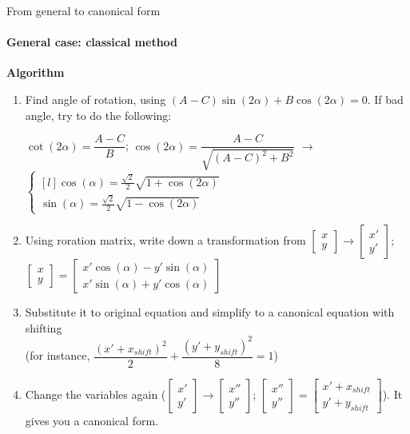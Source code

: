 \documentclass[aspectratio=169]{beamer}
\begin{document}
\begin{frame}[t]{From general to canonical form}
\framesubtitle{General case: classical method}
\scriptsize
\vspace{-0.2cm}
        \textbf{Algorithm}
        \begin{enumerate}
            \item Find angle of rotation, using $(A-C)\sin(2\alpha) + B\cos(2\alpha)=0$. If bad angle, try to do the following: \medskip

             $\cot(2\alpha)=\dfrac{A-C}{B}$; $\cos(2\alpha)=\dfrac{A-C}{\sqrt{(A-C)^2+B^2}}$ $\rightarrow$ $\left\{\begin{matrix*}[l] \cos(\alpha)=\frac{\sqrt{2}}{2}\sqrt{1+\cos(2\alpha)}
            \\ \sin(\alpha)=\frac{\sqrt{2}}{2}\sqrt{1-\cos(2\alpha)}
            \end{matrix*}\right.$
            \item Using roration matrix, write down a transformation from $\begin{bmatrix}x\\y\end{bmatrix} \rightarrow \begin{bmatrix}x'\\y'\end{bmatrix}$; $\begin{bmatrix}x\\y\end{bmatrix} = \begin{bmatrix}
            x'\cos(\alpha) - y'\sin(\alpha)\\ 
            x'\sin(\alpha) + y'\cos(\alpha) 
            \end{bmatrix}$
            \item Substitute it to original equation and simplify to a canonical equation with shifting \\ (for instance, $\dfrac{(x'+x_{shift})^2}{2}+\dfrac{(y'+y_{shift})^2}{8}=1$)
            \item Change the variables again ($\begin{bmatrix}x'\\y'\end{bmatrix} \rightarrow \begin{bmatrix}x''\\y''\end{bmatrix}$; $\begin{bmatrix}x''\\y''\end{bmatrix} = \begin{bmatrix}x' + x_{shift}\\y'+y_{shift}\end{bmatrix}$). It gives you a canonical form.

\end{enumerate}
\end{frame}
\end{document}
